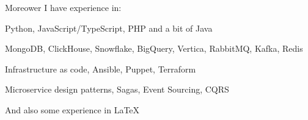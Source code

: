 Moreower I have experience in:
\begin{bulist}
  \item Python, JavaScript/TypeScript, PHP and a bit of Java
  \item MongoDB, ClickHouse, Snowflake, BigQuery, Vertica, RabbitMQ, Kafka,
    Redis
  \item Infrastructure as code, Ansible, Puppet, Terraform
  \item Microservice design patterns, Sagas, Event Sourcing, CQRS
\end{bulist}
And also some experience in \LaTeX
